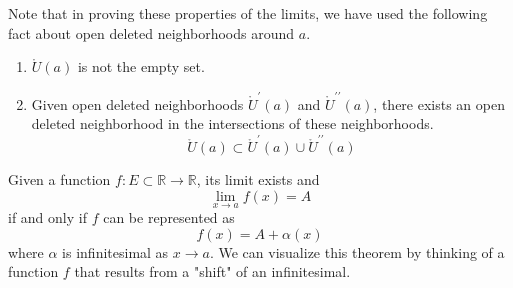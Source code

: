   Note that in proving these properties of the limits, we have used the following fact about open deleted neighborhoods around $a$. 
  \begin{enumerate}
    \item $\mathring{U} (a)$ is not the empty set. 
    \item Given open deleted neighborhoods $\mathring{U}^\prime (a)$ and $\mathring{U}^{\prime\prime} (a)$, there exists an open deleted neighborhood in the intersections of these neighborhoods. 
    \[\mathring{U} (a) \subset \mathring{U}^\prime (a) \cup \mathring{U}^{\prime\prime} (a)\]
  \end{enumerate}

  \begin{theorem}
    Given a function $f: E \subset \mathbb{R} \longrightarrow \mathbb{R}$, its limit exists and 
    \begin{equation}
      \lim_{x \rightarrow a} f(x) = A
    \end{equation}
    if and only if $f$ can be represented as 
    \begin{equation}
      f(x) = A + \alpha (x)
    \end{equation}
    where $\alpha$ is infinitesimal as $x \rightarrow a$. We can visualize this theorem by thinking of a function $f$ that results from a "shift" of an infinitesimal. 

    \begin{figure}[H]
      \centering 
\end{figure}
\end{theorem}
